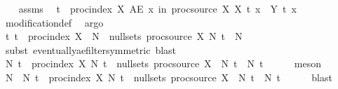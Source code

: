 \begin{isabellebody}
\ \ \isamarkupfalse%
\ assms{\isacharparenleft}{\kern0pt}{}{\isacharparenright}{\kern0pt}\ \isamarkupfalse%
\ {\isachardoublequoteopen}{\isasymforall}t\ {\isasymin}\ proc{\isacharunderscore}{\kern0pt}index\ X{\isachardot}{\kern0pt}\ AE\ x\ in\ proc{\isacharunderscore}{\kern0pt}source\ X{\isachardot}{\kern0pt}\ X\ t\ x\ {\isacharequal}{\kern0pt}\ Y\ t\ x{\isachardoublequoteclose}\isanewline
\ \ \ \ \isamarkupfalse%
\ modification{\isacharunderscore}{\kern0pt}def\ \isamarkupfalse%
\ argo\isanewline
\ \ \isamarkupfalse%
\ \isamarkupfalse%
\ {\isachardoublequoteopen}{\isasymAnd}t{\isachardot}{\kern0pt}\ t\ {\isasymin}\ proc{\isacharunderscore}{\kern0pt}index\ X\ {\isasymLongrightarrow}\ {\isasymexists}N\ {\isasymin}\ null{\isacharunderscore}{\kern0pt}sets\ {\isacharparenleft}{\kern0pt}proc{\isacharunderscore}{\kern0pt}source\ X{\isacharparenright}{\kern0pt}{\isachardot}{\kern0pt}\ {\isacharquery}{\kern0pt}N\ t\ {\isasymsubseteq}\ N{\isachardoublequoteclose}\isanewline
\ \ \ \ \isamarkupfalse%
\ {\isacharparenleft}{\kern0pt}subst\ eventually{\isacharunderscore}{\kern0pt}ae{\isacharunderscore}{\kern0pt}filter{\isacharbrackleft}{\kern0pt}symmetric{\isacharbrackright}{\kern0pt}{\isacharcomma}{\kern0pt}\ blast{\isacharparenright}{\kern0pt}\isanewline
\ \ \isamarkupfalse%
\ \isamarkupfalse%
\ {\isachardoublequoteopen}{\isasymexists}N{\isachardot}{\kern0pt}\ {\isasymforall}t\ {\isasymin}\ proc{\isacharunderscore}{\kern0pt}index\ X{\isachardot}{\kern0pt}\ N\ t\ {\isasymin}\ null{\isacharunderscore}{\kern0pt}sets\ {\isacharparenleft}{\kern0pt}proc{\isacharunderscore}{\kern0pt}source\ X{\isacharparenright}{\kern0pt}\ {\isasymand}\ {\isacharquery}{\kern0pt}N\ t\ {\isasymsubseteq}\ N\ t{\isachardoublequoteclose}\isanewline
\ \ \ \ \isamarkupfalse%
\ meson\isanewline
\ \ \isamarkupfalse%
\ \isamarkupfalse%
\ N\ \ N{\isacharcolon}{\kern0pt}\ {\isachardoublequoteopen}{\isasymforall}t\ {\isasymin}\ proc{\isacharunderscore}{\kern0pt}index\ X{\isachardot}{\kern0pt}\ {\isacharparenleft}{\kern0pt}N\ t{\isacharparenright}{\kern0pt}\ {\isasymin}\ null{\isacharunderscore}{\kern0pt}sets\ {\isacharparenleft}{\kern0pt}proc{\isacharunderscore}{\kern0pt}source\ X{\isacharparenright}{\kern0pt}\ {\isasymand}\ {\isacharquery}{\kern0pt}N\ t\ {\isasymsubseteq}\ N\ t{\isachardoublequoteclose}\isanewline
\ \ \ \ \isamarkupfalse%
\ blast\isanewline

\end{isabellebody}
